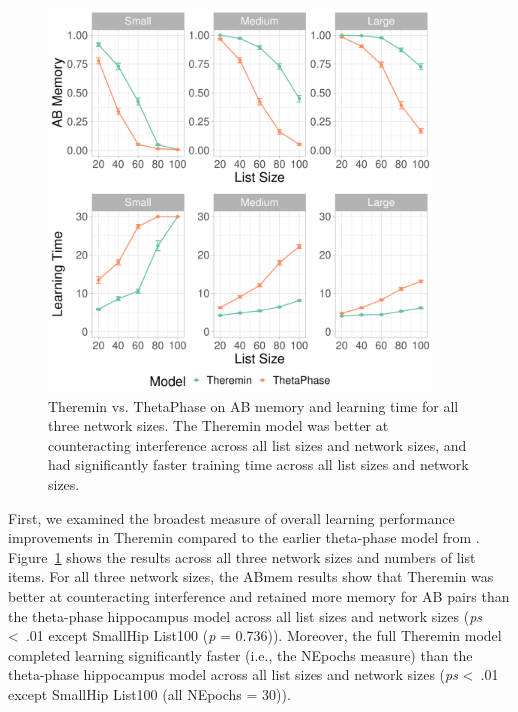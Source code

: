 \documentclass[11pt,twoside]{article}
\newif\myifpdf
\begin{document}
\begin{figure}
  \centering\includegraphics[width=4in]{fig_hip_edl_thetaphase}
  \caption{\footnotesize Theremin vs. ThetaPhase on AB memory and learning time for all three network sizes.  The Theremin model was better at counteracting interference across all list sizes and network sizes, and had significantly faster training time across all list sizes and network sizes.}
\label{fig.thetaphase}
\end{figure}

First, we examined the broadest measure of overall learning performance improvements in Theremin compared to the earlier theta-phase model from \citet{KetzMorkondaOReilly13}.  Figure~\ref{fig.thetaphase} shows the results across all three network sizes and numbers of list items.  For all three network sizes, the ABmem results show that Theremin was better at counteracting interference and retained more memory for AB pairs than the theta-phase hippocampus model across all list sizes and network sizes (\emph{ps} \textless \ .01 except SmallHip List100 (\emph{p} = 0.736)). Moreover, the full Theremin model completed learning significantly faster (i.e., the NEpochs measure) than the theta-phase hippocampus model across all list sizes and network sizes (\emph{ps} \textless \ .01 except SmallHip List100 (all NEpochs = 30)).
\end{document}
